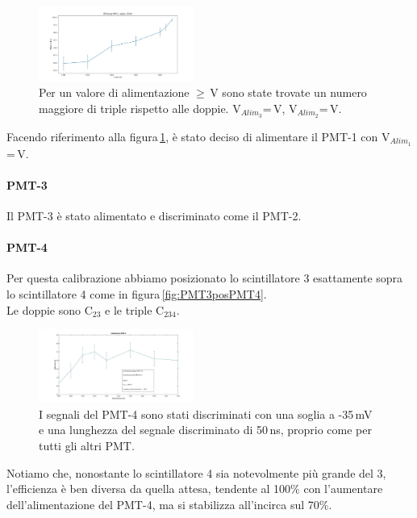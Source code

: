 \documentclass[a4paper,twocolumn]{article}
\begin{document}
\begin{figure}[H]
\centering
\includegraphics[width=0.45\textwidth]{./immagini/TimeOfFlight/EffPMT135mV}
\caption{Per un valore di alimentazione $\geq$\,V sono state trovate un numero maggiore di triple rispetto alle doppie. V$_{Alim_3}$\:=\,V, V$_{Alim_2}$\:=\,V.}
\label{fig:EffPMT135mV}
\end{figure}

Facendo riferimento alla figura\,\ref{fig:EffPMT135mV}, è stato deciso di alimentare il PMT-1 con V$_{Alim_1}$\:=\,V.

\paragraph{PMT-3}
Il PMT-3 è stato alimentato e discriminato come il PMT-2.

\paragraph{PMT-4}
\label{sec:CalPMT-4}
Per questa calibrazione abbiamo posizionato lo scintillatore 3 esattamente sopra lo scintillatore 4 come in figura\,\ref{fig:PMT3posPMT4}.\\
Le doppie sono C$_{23}$ e le triple C$_{234}$.

\begin{figure}[H]
\centering
\includegraphics[width=0.45\textwidth]{./immagini/TimeOfFlight/CoincidenzePMT4.jpg}
\caption{I segnali del PMT-4 sono stati discriminati con una soglia a -35\,mV e una lunghezza del segnale discriminato di 50\,ns, proprio come per tutti gli altri PMT.}
\label{fig:EffPMT4}
\end{figure}

Notiamo che, nonostante lo scintillatore 4 sia notevolmente più grande del 3, l'efficienza è ben diversa da quella attesa, tendente al 100$\%$ con l'aumentare dell'alimentazione del PMT-4, ma si stabilizza all'incirca sul 70$\%$.
\end{document}
